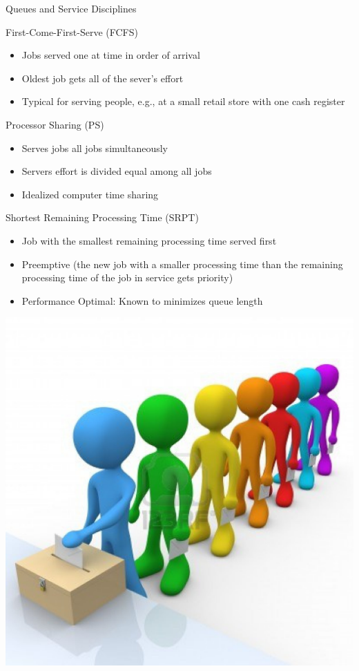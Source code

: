 \documentclass[16pt]{beamer}
\begin{document}
\begin{frame}
\begin{textblock}{35}
\begin{block}{\huge Queues and Service Disciplines}
\begin{minipage}{18cm}
First-Come-First-Serve (FCFS)
{\small
\begin{itemize}
\item Jobs served one at time in order of arrival
\item Oldest job gets all of the sever's effort
\item Typical for serving people, e.g., at a small retail store with one cash register
\end{itemize}
}
\vspace{0.5cm}
Processor Sharing (PS)
{\small
\begin{itemize}
\item Serves jobs all jobs simultaneously
\item Servers effort is divided equal among all jobs
\item Idealized computer time sharing
\end{itemize}
}
\vspace{0.5cm}
Shortest Remaining Processing Time (SRPT)
{\small
\begin{itemize}
\item Job with the smallest remaining processing time served first
\item Preemptive (the new job with a smaller
processing time than the remaining processing time of the job in service gets priority)
\item Performance Optimal: Known to minimizes queue length
\end{itemize}
}
\end{minipage}
\begin{minipage}{16cm}
\begin{center}
\includegraphics[width=16cm]{Pictures/queue.jpg}
\end{center}
\end{minipage}
\end{block}
\vspace{\baselineskip}


\end{textblock}
\end{frame}
\end{document}
